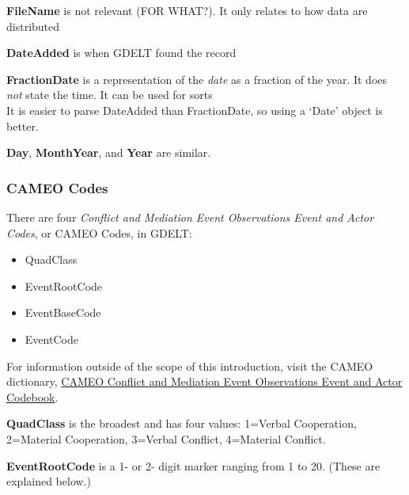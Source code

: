 \par \textbf{FileName} is not relevant (FOR WHAT?). It only relates to how data are distributed %

\par \textbf{DateAdded} is when GDELT found the record %

\par \textbf{FractionDate} is a representation of the \emph{date} as a fraction of the year. It does \emph{not} state the time. It can be used for sorts %
\\It is easier to parse DateAdded than FractionDate, so using a ‘Date’ object is better. %

\textbf{Day}, \textbf{MonthYear}, and \textbf{Year} are similar. %


\subsubsection{CAMEO Codes}
There are four \emph{Conflict and Mediation Event Observations Event and Actor Codes}, or CAMEO Codes, in GDELT:
\begin{itemize} \item QuadClass \item EventRootCode \item EventBaseCode \item EventCode \end{itemize}

\par  For information outside of the scope of this introduction, visit the CAMEO dictionary, \href{http://data.gdeltproject.org/documentation/CAMEO.Manual.1.1b3.pdf}{CAMEO Conflict and Mediation Event Observations Event and Actor Codebook}.

\par \textbf{QuadClass} is the broadest %
and has four values: 1=Verbal Cooperation, 2=Material Cooperation, 3=Verbal Conflict, 4=Material Conflict.

\par \textbf{EventRootCode} is a 1- or 2- digit marker ranging from 1 to 20. (These are explained below.)

